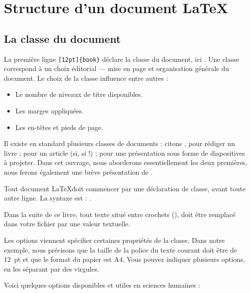 \section{Structure d'un document \LaTeX}

\subsection{La classe du document}
La première ligne \verb|[12pt]{book}| déclare la classe du document, ici . Une classe correspond à un choix éditorial    --- mise en page et organisation générale du document. Le choix de la classe influence entre autres :
\begin{itemize}
\item Le nombre de niveaux de titre disponibles.
\item Les marges appliquées.
\item Les en-têtes et pieds de page.
\end{itemize}

Il existe en standard plusieurs classes de documents : citons , pour rédiger un livre ;  pour un article (si, si !) ;  pour une présentation sous forme de diapositives à projeter. Dans cet ouvrage, nous aborderons essentiellement les deux premières, nous ferons également une brève présentation de .



Tout document \LaTeX doit commencer par une déclaration de classe, avant toute autre ligne.
La syntaxe est  : 
.

\begin{attention}
Dans la suite de ce livre, tout texte situé entre crochets (), doit être remplacé dans votre fichier  par une valeur textuelle.
\end{attention}

Les options viennent spécifier certaines propriétés de la classe. Dans notre exemple, nous précisons que la taille de la police du texte courant doit être de 12~pt et que le format du papier est A4. Vous pouvez indiquer plusieurs options, en les séparant par des virgules.\label{optionsclasse}

Voici quelques options disponibles et utiles en sciences humaines :

